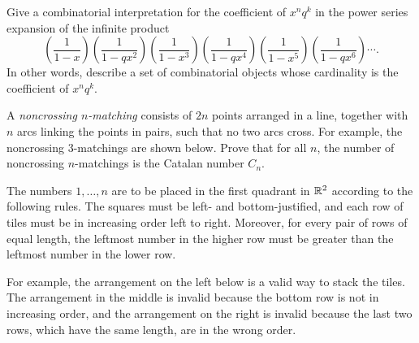 
 Give a combinatorial interpretation for the coefficient of $x^nq^k$ in the power series expansion of the infinite product
\[\left(\frac{1}{1-x}\right) \left(\frac{1}{1-qx^2}\right)
\left(\frac{1}{1-x^3}\right) \left(\frac{1}{1-qx^4}\right)
\left(\frac{1}{1-x^5}\right) \left(\frac{1}{1-qx^6}\right)\cdots.\]
In other words, describe a set of combinatorial objects whose cardinality is the coefficient of $x^nq^k$.

 A \emph{noncrossing $n$-matching} consists of $2n$ points arranged in a line, together with $n$ arcs linking the points in pairs, such that no two arcs cross.  For example, the noncrossing 3-matchings are shown below.  Prove that for all $n$, the number of noncrossing $n$-matchings is the Catalan number $C_n$.

The numbers $1,\dots,n$ are to be placed in the first quadrant in $\mathbb{R}^2$ according to the following rules.
The squares must be left- and bottom-justified, and each row of tiles must be in increasing order left to right.
Moreover, for every pair of rows of equal length, the leftmost number in the higher row must be greater than the leftmost number in the lower row.

For example, the arrangement on the left below is a valid way to stack the tiles.  The arrangement in the middle is invalid because the bottom row is not in increasing order, and the arrangement on the right is invalid because the last two rows, which have the same length, are in the wrong order.

